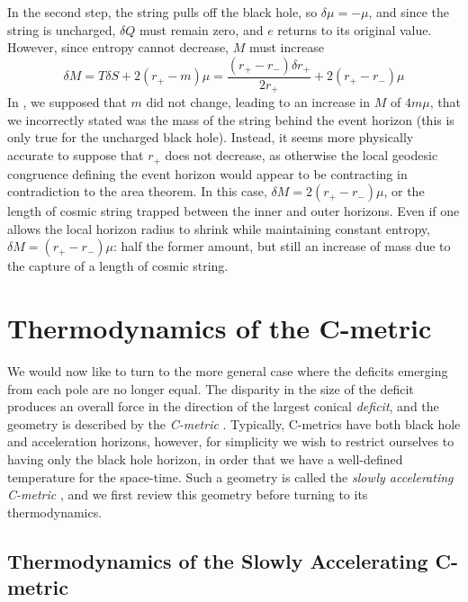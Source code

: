 \documentclass[
twoside,openright,frontopenright]{dmathesis}
\newcommand{\todoopt}[2][]{\todo[color=blue!20,size=\footnotesize,#1]{#2}}
\begin{document}
In the second step, the string pulls off the black hole, so $\delta \mu = -\mu$,
and since the string is uncharged, $\delta Q$ must remain zero, and $e$ 
returns to its original value. However, since entropy cannot decrease, 
$M$ must increase
\begin{equation}
\delta M = T\delta S + 2(r_+-m)\mu
= \frac{(r_+-r_-) \delta r_+}{2r_+} + 2(r_+-r_-)\mu 
\end{equation}
In \cite{Bonjour:1998rf}, we supposed that $m$ did not change, leading to an
increase in $M$ of $4m\mu$, that we incorrectly stated was the mass of the
string behind the event horizon (this is only true for the uncharged black
hole). Instead, it seems more physically accurate to suppose that $r_+$ does not
decrease, as otherwise the local geodesic congruence defining the event horizon
would appear to be contracting in contradiction to the area theorem.  In this
case, $\delta M = 2 (r_+-r_-) \mu$, or the length of cosmic string trapped
between the inner and outer horizons. Even if one allows the local horizon
radius to shrink while maintaining constant entropy,
$\delta M = (r_+ - r_-)\mu$: half the former amount, but still an increase of
mass due to the capture of a length of cosmic string.

\section{Thermodynamics of the C-metric}

We would now like to turn to the more general case where the deficits emerging
from each pole are no longer equal. The disparity in the size of the deficit
produces an overall force in the direction of the largest conical {\it deficit},
and the geometry is described by the {\it C-metric} \cite{Kinnersley:1970zw,
  Plebanski:1976gy, Dias:2002mi, Griffiths:2005qp, Podolsky:2002nk}.  Typically,
C-metrics have both black hole and acceleration horizons, however, for
simplicity we wish to restrict ourselves to having only the black hole horizon,
in order that we have a well-defined temperature for the space-time. Such a
geometry is called the {\it slowly accelerating C-metric}
\cite{Podolsky:2002nk}, and we first review this geometry before turning to its
thermodynamics.\todoopt{removed review here}


\subsection{Thermodynamics of the Slowly Accelerating C-metric}
\end{document}

